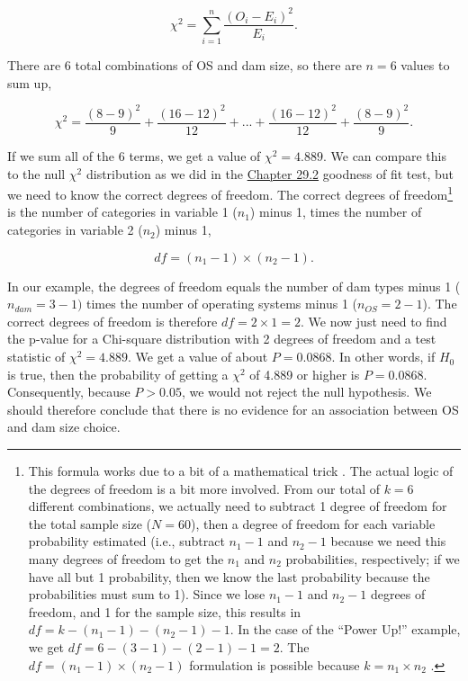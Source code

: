\documentclass[
  openany]{scrbook}
\begin{document}
\[\chi^{2} = \sum_{i = 1}^{n} \frac{\left(O_{i} - E_{i}\right)^{2}}{E_{i}}.\]

There are 6 total combinations of OS and dam size, so there are \(n = 6\) values to sum up,

\[\chi^{2} = \frac{(8-9)^2}{9} + \frac{(16 - 12)^{2}}{12} + ... + \frac{(16 - 12)^{2}}{12} + \frac{(8-9)^2}{9}.\]

If we sum all of the 6 terms, we get a value of \(\chi^{2} = 4.889\).
We can compare this to the null \(\chi^{2}\) distribution as we did in the \protect\hyperlink{chi-squared-goodness-of-fit}{Chapter 29.2} goodness of fit test, but we need to know the correct degrees of freedom.
The correct degrees of freedom\footnote{This formula works due to a bit of a mathematical trick \citep{Sokal1995}. The actual logic of the degrees of freedom is a bit more involved. From our total of \(k = 6\) different combinations, we actually need to subtract 1 degree of freedom for the total sample size (\(N = 60\)), then a degree of freedom for each variable probability estimated (i.e., subtract \(n_{1} - 1\) and \(n_{2} - 1\) because we need this many degrees of freedom to get the \(n_{1}\) and \(n_{2}\) probabilities, respectively; if we have all but 1 probability, then we know the last probability because the probabilities must sum to 1). Since we lose \(n_{1} - 1\) and \(n_{2} - 1\) degrees of freedom, and 1 for the sample size, this results in \(df = k - (n_{1} - 1) - (n_{2} - 1) - 1\). In the case of the ``Power Up!'' example, we get \(df = 6 - (3 - 1) - (2 - 1) - 1 = 2\). The \(df = (n_{1} - 1) \times (n_{2} - 1)\) formulation is possible because \(k = n_{1} \times n_{2}\) \citep{Sokal1995}.} is the number of categories in variable 1 (\(n_{1}\)) minus 1, times the number of categories in variable 2 (\(n_{2}\)) minus 1,

\[df = (n_{1} - 1) \times (n_{2} - 1).\]

In our example, the degrees of freedom equals the number of dam types minus 1 (\(n_{dam} = 3 - 1)\) times the number of operating systems minus 1 (\(n_{OS} = 2 - 1\)).
The correct degrees of freedom is therefore \(df = 2 \times 1 = 2\).
We now just need to find the p-value for a Chi-square distribution with 2 degrees of freedom and a test statistic of \(\chi^{2} = 4.889\).
We get a value of about \(P = 0.0868\).
In other words, if \(H_{0}\) is true, then the probability of getting a \(\chi^{2}\) of 4.889 or higher is \(P = 0.0868\).
Consequently, because \(P > 0.05\), we would not reject the null hypothesis.
We should therefore conclude that there is no evidence for an association between OS and dam size choice.
\end{document}
